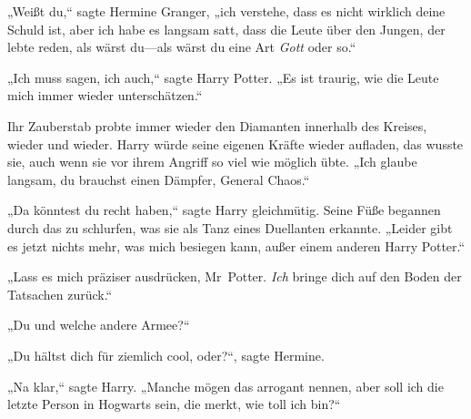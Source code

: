 „Weißt du,“ sagte Hermine Granger, „ich verstehe, dass es nicht wirklich deine Schuld ist, aber ich habe es langsam satt, dass die Leute über den Jungen, der lebte reden, als wärst du—als wärst du eine Art \emph{Gott} oder so.“

„Ich muss sagen, ich auch,“ sagte Harry Potter. „Es ist traurig, wie die Leute mich immer wieder unterschätzen.“

Ihr Zauberstab probte immer wieder den Diamanten innerhalb des Kreises, wieder und wieder. Harry würde seine eigenen Kräfte wieder aufladen, das wusste sie, auch wenn sie vor ihrem Angriff so viel wie möglich übte. „Ich glaube langsam, du brauchst einen Dämpfer, General Chaos.“

„Da könntest du recht haben,“ sagte Harry gleichmütig. Seine Füße begannen durch das zu schlurfen, was sie als Tanz eines Duellanten erkannte. „Leider gibt es jetzt nichts mehr, was mich besiegen kann, außer einem anderen Harry Potter.“

„Lass es mich präziser ausdrücken, Mr~Potter. \emph{Ich} bringe dich auf den Boden der Tatsachen zurück.“

„Du und welche andere Armee?“

„Du hältst dich für ziemlich cool, oder?“, sagte Hermine.

„Na klar,“ sagte Harry. „Manche mögen das arrogant nennen, aber soll ich die letzte Person in Hogwarts sein, die merkt, wie toll ich bin?“

